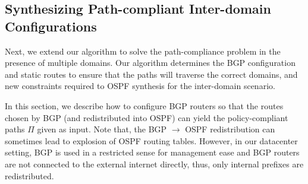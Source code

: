 \subsection{Synthesizing Path-compliant Inter-domain \\ Configurations}
\label{sec:inter-synthesis}
Next, we extend our algorithm to
solve the path-compliance problem in the presence
of multiple domains. 
Our algorithm determines the 
BGP configuration and static routes to ensure that the 
paths will traverse the correct domains, and 
new constraints required to OSPF synthesis for the inter-domain scenario.


\begin{figure}
	\centering
	\hfill
	\hfill
\end{figure}

In this section, we describe how to configure
BGP routers so that the routes chosen by BGP 
(and redistributed into OSPF) 
can yield the policy-compliant
paths $\Pi$ given as input. 
Note that, the BGP $\rightarrow$ OSPF redistribution
can sometimes lead to explosion of OSPF routing tables. However, 
in our datacenter setting, BGP is used in a restricted
sense for management ease and BGP routers are not connected
to the external internet directly, thus, only internal
prefixes are redistributed.


